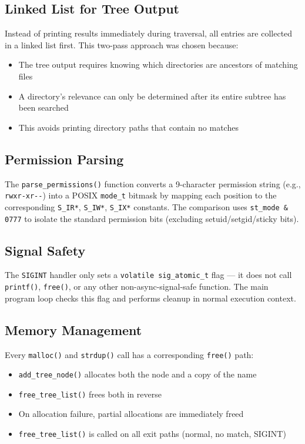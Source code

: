 \documentclass[12pt,a4paper]{article}
\begin{document}
\subsection{Linked List for Tree Output}

Instead of printing results immediately during traversal, all entries are collected in a linked list first. This two-pass approach was chosen because:

\begin{itemize}[nosep]
    \item The tree output requires knowing which directories are ancestors of matching files
    \item A directory's relevance can only be determined after its entire subtree has been searched
    \item This avoids printing directory paths that contain no matches
\end{itemize}

\subsection{Permission Parsing}

The \texttt{parse\_permissions()} function converts a 9-character permission string (e.g., \texttt{rwxr-xr-{}-}) into a POSIX \texttt{mode\_t} bitmask by mapping each position to the corresponding \texttt{S\_IR*}, \texttt{S\_IW*}, \texttt{S\_IX*} constants. The comparison uses \texttt{st\_mode \& 0777} to isolate the standard permission bits (excluding setuid/setgid/sticky bits).

\subsection{Signal Safety}

The \texttt{SIGINT} handler only sets a \texttt{volatile sig\_atomic\_t} flag --- it does not call \texttt{printf()}, \texttt{free()}, or any other non-async-signal-safe function. The main program loop checks this flag and performs cleanup in normal execution context.

\subsection{Memory Management}

Every \texttt{malloc()} and \texttt{strdup()} call has a corresponding \texttt{free()} path:

\begin{itemize}[nosep]
    \item \texttt{add\_tree\_node()} allocates both the node and a copy of the name
    \item \texttt{free\_tree\_list()} frees both in reverse
    \item On allocation failure, partial allocations are immediately freed
    \item \texttt{free\_tree\_list()} is called on all exit paths (normal, no match, SIGINT)
\end{itemize}
\end{document}
